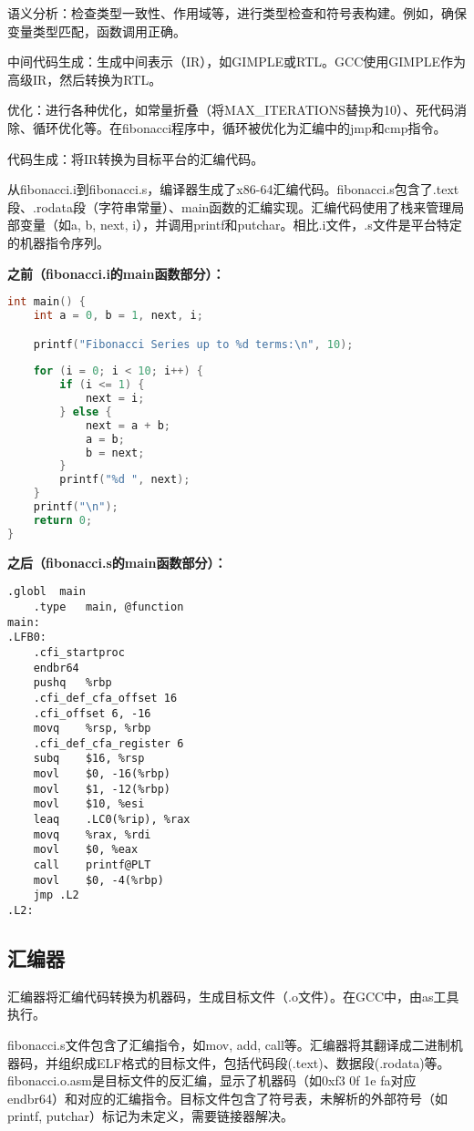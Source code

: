 \documentclass[a4paper]{article}
\begin{document}
语义分析：检查类型一致性、作用域等，进行类型检查和符号表构建。例如，确保变量类型匹配，函数调用正确。

中间代码生成：生成中间表示（IR），如GIMPLE或RTL。GCC使用GIMPLE作为高级IR，然后转换为RTL。

优化：进行各种优化，如常量折叠（将MAX\_ITERATIONS替换为10）、死代码消除、循环优化等。在fibonacci程序中，循环被优化为汇编中的jmp和cmp指令。

代码生成：将IR转换为目标平台的汇编代码。

从fibonacci.i到fibonacci.s，编译器生成了x86-64汇编代码。fibonacci.s包含了.text段、.rodata段（字符串常量）、main函数的汇编实现。汇编代码使用了栈来管理局部变量（如a, b, next, i），并调用printf和putchar。相比.i文件，.s文件是平台特定的机器指令序列。

\textbf{之前（fibonacci.i的main函数部分）：}
\begin{lstlisting}[language=C]
int main() {
    int a = 0, b = 1, next, i;

    printf("Fibonacci Series up to %d terms:\n", 10);
    
    for (i = 0; i < 10; i++) {
        if (i <= 1) {
            next = i;
        } else {
            next = a + b;
            a = b;
            b = next;
        }
        printf("%d ", next);
    }
    printf("\n");
    return 0;
}
\end{lstlisting}

\textbf{之后（fibonacci.s的main函数部分）：}
\begin{lstlisting}[language={[x86masm]Assembler}]
	.globl	main
	.type	main, @function
main:
.LFB0:
	.cfi_startproc
	endbr64
	pushq	%rbp
	.cfi_def_cfa_offset 16
	.cfi_offset 6, -16
	movq	%rsp, %rbp
	.cfi_def_cfa_register 6
	subq	$16, %rsp
	movl	$0, -16(%rbp)
	movl	$1, -12(%rbp)
	movl	$10, %esi
	leaq	.LC0(%rip), %rax
	movq	%rax, %rdi
	movl	$0, %eax
	call	printf@PLT
	movl	$0, -4(%rbp)
	jmp	.L2
.L2:
\end{lstlisting}

\subsection{汇编器}

汇编器将汇编代码转换为机器码，生成目标文件（.o文件）。在GCC中，由as工具执行。

fibonacci.s文件包含了汇编指令，如mov, add, call等。汇编器将其翻译成二进制机器码，并组织成ELF格式的目标文件，包括代码段(.text)、数据段(.rodata)等。fibonacci.o.asm是目标文件的反汇编，显示了机器码（如0xf3 0f 1e fa对应endbr64）和对应的汇编指令。目标文件包含了符号表，未解析的外部符号（如printf, putchar）标记为未定义，需要链接器解决。
\end{document}
